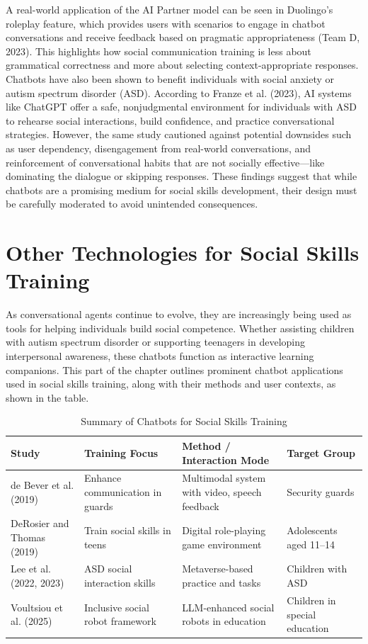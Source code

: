 A real-world application of the AI Partner model can be seen in Duolingo’s roleplay feature, which provides users with scenarios to engage in chatbot conversations and receive feedback based on pragmatic appropriateness (Team D, 2023). This highlights how social communication training is less about grammatical correctness and more about selecting context-appropriate responses. Chatbots have also been shown to benefit individuals with social anxiety or autism spectrum disorder (ASD). According to Franze et al. (2023), AI systems like ChatGPT offer a safe, nonjudgmental environment for individuals with ASD to rehearse social interactions, build confidence, and practice conversational strategies. However, the same study cautioned against potential downsides such as user dependency, disengagement from real-world conversations, and reinforcement of conversational habits that are not socially effective—like dominating the dialogue or skipping responses. These findings suggest that while chatbots are a promising medium for social skills development, their design must be carefully moderated to avoid unintended consequences.

\pagebreak
\section{Other Technologies for Social Skills Training}

As conversational agents continue to evolve, they are increasingly being used as tools for helping individuals build social competence. Whether assisting children with autism spectrum disorder or supporting teenagers in developing interpersonal awareness, these chatbots function as interactive learning companions. This part of the chapter outlines prominent chatbot applications used in social skills training, along with their methods and user contexts, as shown in the table.

\begin{table}[H]
\centering
\caption{Summary of Chatbots for Social Skills Training}
\small
\begin{tabular}{p{3.3cm} p{3.7cm} p{3.7cm} p{3.7cm}}
\toprule
\textbf{Study} & \textbf{Training Focus} & \textbf{Method / Interaction Mode} & \textbf{Target Group} \\
\midrule
de Bever et al. (2019) & Enhance communication in guards & Multimodal system with video, speech feedback & Security guards \\
DeRosier and Thomas (2019) & Train social skills in teens & Digital role-playing game environment & Adolescents aged 11–14 \\
Lee et al. (2022, 2023) & ASD social interaction skills & Metaverse-based practice and tasks & Children with ASD \\
Voultsiou et al. (2025) & Inclusive social robot framework & LLM-enhanced social robots in education & Children in special education \\
\bottomrule
\end{tabular}
\end{table}

